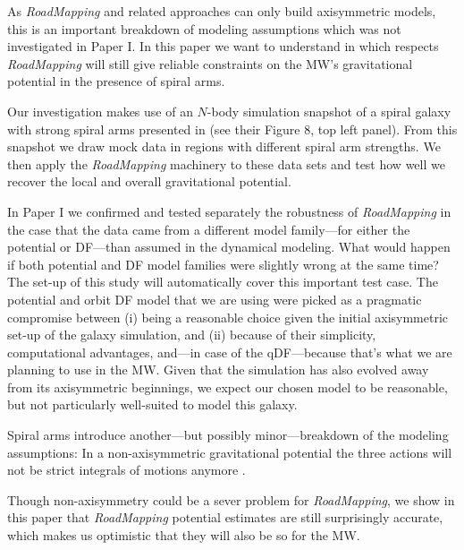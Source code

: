 \documentclass[iop,revtex4,numberedappendix,appendixfloats]{emulateapj}
\newcommand{\RM}{{\sl RoadMapping}}
\begin{document}
As \RM{} and related approaches can only build axisymmetric models, this is an important breakdown of modeling assumptions which was not investigated in Paper I. In this paper we want to understand in which respects \RM{} will still give reliable constraints on the MW's gravitational potential in the presence of spiral arms.

Our investigation makes use of an $N$-body simulation snapshot of a spiral galaxy with strong spiral arms presented in \citet{2013ApJ...766...34D} (see their Figure 8, top left panel). From this snapshot we draw mock data in regions with different spiral arm strengths. We then apply the \RM{} machinery to these data sets and test how well we recover the local and overall gravitational potential.

In Paper I we confirmed and tested separately the robustness of \RM{} in the case that the data came from a different model family---for either the potential or DF---than assumed in the dynamical modeling. What would happen if both potential and DF model families were slightly wrong at the same time? The set-up of this study will automatically cover this important test case. The potential and orbit DF model that we are using were picked as a pragmatic compromise between (i) being a reasonable choice given the initial axisymmetric set-up of the galaxy simulation, and (ii) because of their simplicity, computational advantages, and---in case of the qDF---because that's what we are planning to use in the MW. Given that the simulation has also evolved away from its axisymmetric beginnings, we expect our chosen model to be reasonable, but not particularly well-suited to model this galaxy.

Spiral arms introduce another---but possibly minor---breakdown of the modeling assumptions: In a non-axisymmetric gravitational potential the three actions will not be strict integrals of motions anymore \citep{2008gady.book.....B,2011A&A...527A.147M,2012A&A...548A.127M,2012MNRAS.422.1363S,2012MNRAS.421.1529G,2016ApJ...824...39V}.

Though non-axisymmetry could be a sever problem for \RM{}, we show in this paper that \RM{} potential estimates are still surprisingly accurate, which makes us optimistic that they will also be so for the MW. 
\end{document}
